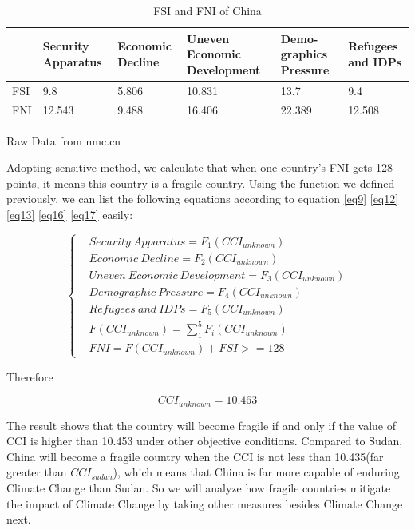 \documentclass[a4paper,12pt]{article}
\begin{document}
\begin{table}[ht]
  \caption{FSI and FNI of China}
  \label{tab2}
  \centering
  \begin{tabular}{lp{1.7cm}p{1.7cm}p{1.7cm}p{1.7cm}p{1.7cm}}
  \toprule
  \textbf{} &\textbf{Security Apparatus} &\textbf{Economic Decline}&\textbf{Uneven Economic Development}&\textbf{Demo-graphics Pressure}&\textbf{Refugees and IDPs}\\
  \midrule
  FSI & 9.8 & 5.806 & 10.831 & 13.7 & 9.4\\
  FNI & 12.543 &9.488&16.406 &22.389&12.508\\
  \bottomrule
  \end{tabular}
  \begin{tablenotes}
    \item
     \begin{flushright}
       Raw Data from nmc.cn
     \end{flushright}
  \end{tablenotes}
\end{table}
Adopting sensitive method, we calculate that when one country's FNI gets 128 points, it means this country is a fragile country. Using the function we defined previously, we can list the following equations according to equation \eqref{eq9} \eqref{eq12} \eqref{eq13} \eqref{eq16} \eqref{eq17} easily:

\begin{equation}
\left\{
\begin{aligned}
&Security~Apparatus = F_1(CCI_{unknown})\\
&Economic~Decline = F_2(CCI_{unknown})\\
&Uneven~Economic~Development =F_3(CCI_{unknown})\\
&Demographic~Pressure=F_4(CCI_{unknown})\\
&Refugees~and~IDPs=F_5(CCI_{unknown})\\
&F(CCI_{unknown})=\sum_1^5{F_i(CCI_{unknown})}\\
&FNI=F(CCI_{unknown})+FSI>=128
\end{aligned}
\right.
\end{equation}

Therefore

\begin{equation}
CCI_{unknown}=10.463
\end{equation}

The result shows that the country will become fragile if and only if the value of CCI is higher than 10.453 under other objective conditions. Compared to Sudan, China will become a fragile country when the CCI is not less than 10.435(far greater than $CCI_{sudan}$), which means that China is far more capable of enduring Climate Change than Sudan. So we will analyze how fragile countries mitigate the impact of Climate Change by taking other measures besides Climate Change next.
\end{document}
